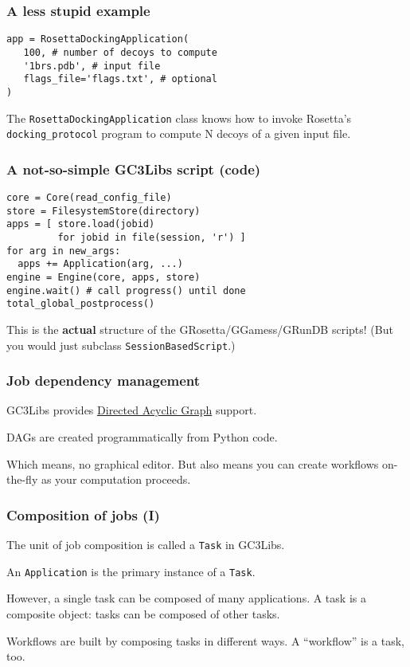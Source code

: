 \documentclass[presentation]{beamer}
\begin{document}
\begin{frame}[fragile]
  \frametitle{A less stupid example}
  \label{sec-9}

\begin{verbatim}
app = RosettaDockingApplication(
   100, # number of decoys to compute
   '1brs.pdb', # input file
   flags_file='flags.txt', # optional
)
\end{verbatim}

  The \texttt{RosettaDockingApplication} class knows how to invoke Rosetta's
  \texttt{docking\_protocol} program to compute N decoys of a given input file.
\end{frame}

\begin{frame}[fragile]
  \frametitle{A not-so-simple GC3Libs script (code)}
  \label{sec-20}

\begin{verbatim}
core = Core(read_config_file)
store = FilesystemStore(directory)
apps = [ store.load(jobid) 
         for jobid in file(session, 'r') ]
for arg in new_args:
  apps += Application(arg, ...)
engine = Engine(core, apps, store)
engine.wait() # call progress() until done
total_global_postprocess()
\end{verbatim}

  This is the \textbf{actual} structure of the GRosetta/GGamess/GRunDB
  scripts!   (But you would just subclass \texttt{SessionBasedScript}.)
\end{frame}

\begin{frame}
  \frametitle{Job dependency management}
  \label{sec-22}

  GC3Libs provides \href{http://en.wikipedia.org/wiki/Directed_acyclic_graph}{Directed Acyclic Graph} support.

  DAGs are created programmatically from Python code.

  Which means, no graphical editor.  But also means you can create
  workflows on-the-fly as your computation proceeds.
\end{frame}

\begin{frame}
  \frametitle{Composition of jobs (I)}
  \label{sec-23}

  The unit of job composition is called a \texttt{Task} in GC3Libs.

  An \texttt{Application} is the primary instance of a \texttt{Task}.

  However, a single task can be composed of many applications.
  A task is a composite object: tasks can be composed of other tasks.

  Workflows are built by composing tasks in different ways.
  A ``workflow'' is a task, too.
\end{frame}
\end{document}
